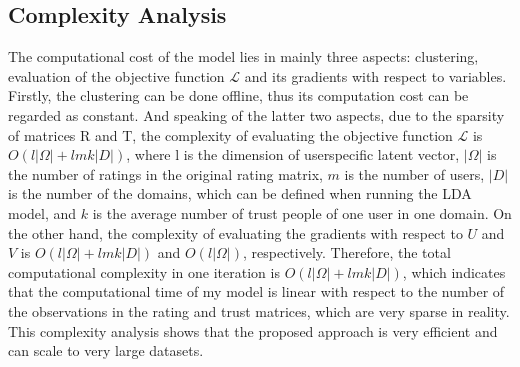 \subsection{Complexity Analysis}
The computational cost of the model lies in mainly three aspects: clustering, evaluation of the objective function $\mathcal{L}$ and its gradients with respect to variables. Firstly, the clustering can be done offline, thus its computation cost can be regarded as constant. And speaking of the latter two aspects, due to the sparsity of matrices R and T, the complexity of evaluating the objective function $\mathcal{L}$ is $O(l|\Omega| + lmk|D|)$, where l is the dimension of user\-specific latent vector, $|\Omega|$ is the number of ratings in the original rating matrix, $m$ is the number of users, $|D|$ is the number of the domains, which can be defined when running the LDA model, and $k$ is the average number of trust people of one user in one domain. On the other hand, the complexity of evaluating the gradients with respect to $U$ and $V$ is  $O(l|\Omega| + lmk|D|)$ and $O(l|\Omega|)$, respectively. Therefore, the total computational complexity in one iteration is $O(l|\Omega| + lmk|D|)$, which indicates that the computational time of my model is linear with respect to the number of the observations in the rating and trust matrices, which are very sparse in reality. This complexity analysis shows that the proposed approach is very efficient and can scale to very large datasets.
